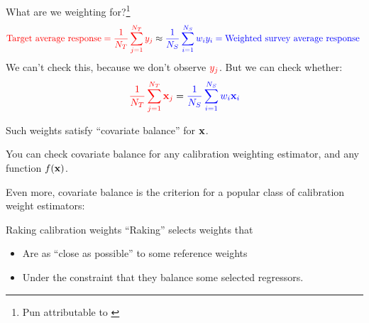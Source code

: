 

\begin{frame}[t]{What are we weighting for?\footnote{Pun attributable to \textcite{solon:2015:weightingfor}}}
$$
\textcolor{red}{\textrm{Target average response} =
\frac{1}{{N_T}} \sum_{j=1}^{N_T} y_j} \approx \textcolor{blue}{\frac{1}{{N_S}} \sum_{i=1}^{N_S} w_i y_i
= \textrm{Weighted survey average response }}
$$
We can't check this, because we don't observe $\textcolor{red}{y_j}$.  \pause But we can check whether:
$$
    \textcolor{red}{\frac{1}{{N_T}} \sum_{j=1}^{N_T} \mathbf{x}_j} = \textcolor{blue}{\frac{1}{{N_S}} \sum_{i=1}^{N_S} w_i \mathbf{x}_i}
$$

Such weights satisfy ``covariate balance'' for $\mathbf{x}$.

You can check covariate balance for any calibration weighting estimator,
and any function $f(\mathbf{x})$.

\pause
Even more, covariate balance is the criterion for a popular class of calibration
weight estimators:

\begin{block}{Raking calibration weights}
``Raking'' selects weights that
\vspace{-0.5em}
\begin{itemize}
    \item Are as ``close as possible'' to some reference weights
    \item Under the constraint that they balance some selected regressors.
\end{itemize}
%
\end{block}



\end{frame}





